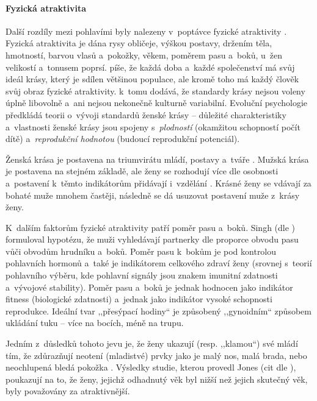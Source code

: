 \documentclass[a4paper, 12pt, notitlepage, oneside, numbers=noenddot]{report}
\begin{document}
\paragraph{Fyzická atraktivita}

Další rozdíly mezi pohlavími byly nalezeny v~poptávce fyzické
atraktivity \citep{Buss2007}.  Fyzická atraktivita je dána rysy
obličeje, výškou postavy, držením těla, hmotností, barvou vlasů
a~pokožky, věkem, poměrem pasu a~boků, u~žen velikostí a~tonusem
poprsí.  \citet{Slamenik2008} píše, že každá doba a~každé společenství
má svůj ideál krásy, který je sdílen většinou populace, ale kromě toho
má každý člověk svůj obraz fyzické atraktivity.  \citet{Buss2007}
k~tomu dodává, že standardy krásy nejsou voleny úplně libovolně a~ani
nejsou nekonečně kulturně variabilní.  Evoluční psychologie předkládá
teorii o~vývoji standardů ženské krásy -- důležité charakteristiky
a~vlastnosti ženské krásy jsou spojeny s~\emph{plodností} (okamžitou
schopností počít dítě) a~\emph{reprodukční hodnotou} (budoucí
reprodukční potenciál).

Ženská krása je postavena na triumvirátu mládí, postavy a~tváře
\citep{Ridley2007, BussSchmitt1993}.  Mužská krása je postavena na
stejném základě, ale ženy se rozhodují více dle osobnosti a~postavení
k~těmto indikátorům přidávají i~vzdělání \citep{Ridley2007,
  BussSchmitt1993, Buss2007}.  Krásné ženy se vdávají za bohaté muže
mnohem častěji, následně se dá usuzovat postavení muže z~krásy ženy.

K~dalším faktorům fyzické atraktivity patří poměr pasu a~boků.  Singh
(dle \citealp{BarrettDunbarLycett2007, Ridley2007}) formuloval
hypotézu, že muži vyhledávají partnerky dle proporce obvodu pasu vůči
obvodům hrudníku a~boků.  Poměr pasu k~bokům je pod kontrolou
pohlavních hormonů a~také je indikátorem celkového zdraví ženy
(srovnej s~teorií pohlavního výběru, kde pohlavní signály jsou znakem
imunitní zdatnosti a~vývojové stability). Poměr pasu a~boků je jednak
hodnocen jako indikátor fitness (biologické zdatnosti) a~jednak jako
indikátor vysoké schopnosti reprodukce.  Ideální tvar ,,přesýpací
hodiny`` je způsobený ,,gynoidním`` způsobem ukládání tuku -- více na
bocích, méně na trupu.

Jedním z~důsledků tohoto jevu je, že ženy ukazují (resp. ,,klamou``)
své mládí tím, že zdůrazňují neotení (mladistvé) prvky jako je malý
nos, malá brada, nebo neochlupená bledá pokožka \citep{Barber1995}.
Výsledky studie, kterou provedl Jones (cit dle
\citealp{BarrettDunbarLycett2007}), poukazují na to, že ženy, jejichž
odhadnutý věk byl nižší než jejich skutečný věk, byly považovány za
atraktivnější.
\end{document}
